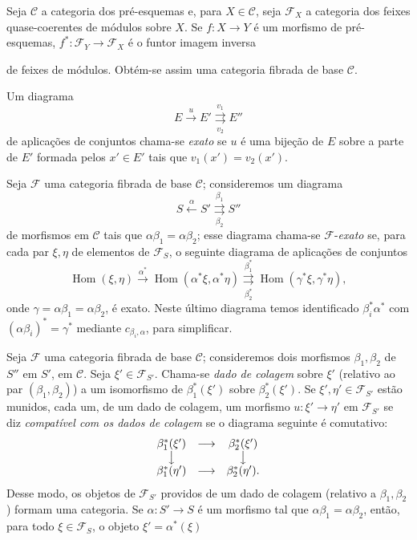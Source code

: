  Seja $\mathcal C$ a categoria dos pré-esquemas e, para
$X\in\mathcal C$, seja $\mathcal F_X$ a categoria dos feixes
quase-coerentes de módulos sobre $X$. Se $f:X\longrightarrow Y$ é um morfismo
de pré-esquemas, $f^*:\mathcal F_Y\longrightarrow\mathcal F_X$ é o funtor
imagem inversa

de feixes de módulos. Obtém-se assim uma categoria fibrada de base
$\mathcal C$.

 Um diagrama
\[
  E\xrightarrow{u}E'
  \overset{v_1}{\underset{v_2}{\rightrightarrows}}E''
\]
de aplicações de conjuntos chama-se \emph{exato} se $u$ é uma bijeção de
$E$ sobre a parte de $E'$ formada pelos $x'\in E'$ tais que
$v_1(x')=v_2(x')$.

 Seja $\mathcal F$ uma categoria fibrada de base
$\mathcal C$; consideremos um diagrama
\[
  \tag{+}
  S\xleftarrow{\alpha}S'
  \overset{\beta_1}{\underset{\beta_2}{\rightrightarrows}}S''
\]
de morfismos em $\mathcal C$ tais que
$\alpha\beta_1=\alpha\beta_2$; esse diagrama chama-se
$\mathcal F$-\emph{exato} se, para cada par $\xi,\eta$ de elementos de
$\mathcal F_S$, o seguinte diagrama de aplicações de conjuntos
\[
  \tag{+'}
  \operatorname{Hom}(\xi,\eta)
  \xrightarrow{\alpha^*}
  \operatorname{Hom}(\alpha^*\xi,\alpha^*\eta)
  \overset{\beta_1^*}{\underset{\beta_2^*}{\rightrightarrows}}
  \operatorname{Hom}(\gamma^*\xi,\gamma^*\eta),
\]
onde $\gamma=\alpha\beta_1=\alpha\beta_2$, é exato. Neste último diagrama
temos identificado $\beta_i^*\alpha^*$ com
$(\alpha\beta_i)^*=\gamma^*$ mediante $c_{\beta_i,\alpha}$, para simplificar.

 Seja $\mathcal F$ uma categoria fibrada de base
$\mathcal C$; consideremos dois morfismos $\beta_1,\beta_2$ de $S''$ em $S'$,
em $\mathcal C$. Seja
$\xi'\in\mathcal F_{S'}$. Chama-se \emph{dado de colagem} sobre $\xi'$
(relativo ao par $(\beta_1,\beta_2)$) a um isomorfismo de
$\beta_1^*(\xi')$ sobre $\beta_2^*(\xi')$. Se $\xi',\eta'\in\mathcal F_{S'}$
estão munidos, cada um, de um dado de colagem, um morfismo
$u:\xi'\longrightarrow\eta'$ em $\mathcal F_{S'}$ se diz
\emph{compatível com os dados de colagem} se o diagrama seguinte é
comutativo:
\[
\begin{array}{ccc}
  \beta_1^*(\xi') & \longrightarrow & \beta_2^*(\xi') \\
  \big\downarrow && \big\downarrow \\
  \beta_1^*(\eta') & \longrightarrow & \beta_2^*(\eta').
\end{array}
\]
Desse modo, os objetos de $\mathcal F_{S'}$ providos de um dado de colagem
(relativo a $\beta_1,\beta_2$) formam uma categoria. Se
$\alpha:S'\longrightarrow S$ é um morfismo tal que
$\alpha\beta_1=\alpha\beta_2$, então, para todo $\xi\in\mathcal F_S$, o
objeto $\xi'=\alpha^*(\xi)$

